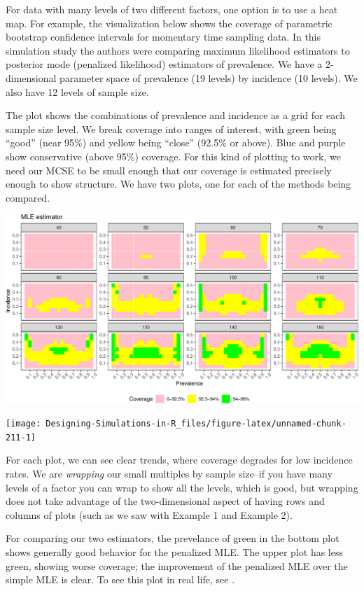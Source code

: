 \documentclass[
]{book}
\begin{document}
For data with many levels of two different factors, one option is to use a heat map.
For example, the visualization below shows the coverage of parametric bootstrap confidence intervals for momentary time sampling data.
In this simulation study the authors were comparing maximum likelihood estimators to posterior mode (penalized likelihood) estimators of prevalence.
We have a 2-dimensional parameter space of prevalence (19 levels) by incidence (10 levels).
We also have 12 levels of sample size.

The plot shows the combinations of prevalence and incidence as a grid for each sample size level.
We break coverage into ranges of interest, with green being ``good'' (near 95\%) and yellow being ``close'' (92.5\% or above).
Blue and purple show conservative (above 95\%) coverage.
For this kind of plotting to work, we need our MCSE to be small enough that our coverage is estimated precisely enough to show structure.
We have two plots, one for each of the methods being compared.

\begin{center}\includegraphics[width=0.75\linewidth]{Designing-Simulations-in-R_files/figure-latex/swan_example_setup-1} \end{center}

\begin{center}\texttt{[image: Designing-Simulations-in-R\_files/figure-latex/unnamed-chunk-211-1]} \end{center}

For each plot, we can see clear trends, where coverage degrades for low incidence rates.
We are \emph{wrapping} our small multiples by sample size--if you have many levels of a factor you can wrap to show all the levels, which is good, but wrapping does not take advantage of the two-dimensional aspect of having rows and columns of plots (such as we saw with Example 1 and Example 2).

For comparing our two estimators, the prevelance of green in the bottom plot shows generally good behavior for the penalized MLE. The upper plot has less green, showing worse coverage; the improvement of the penalized MLE over the simple MLE is clear.
To see this plot in real life, see \citet{pustejovsky2015four}.
\end{document}

